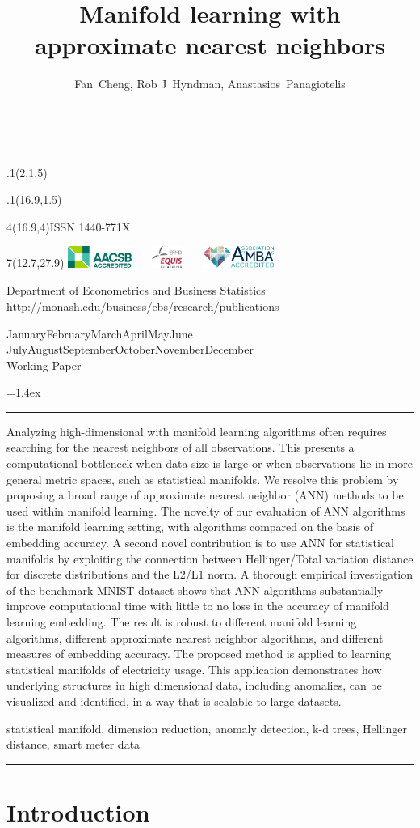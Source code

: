 \documentclass[11pt,a4paper,]{article}
\title{Manifold learning with approximate nearest neighbors}
\author{Fan~Cheng, Rob J~Hyndman, Anastasios~Panagiotelis}
\date{\sf\Date~\Month~\Year}
\makeatletter
\def\Date{\number\day}
\def\Month{\ifcase\month\or
 January\or February\or March\or April\or May\or June\or
 July\or August\or September\or October\or November\or December\fi}
\def\Year{\number\year}
\def\showjel{{\large\textsf{\textbf{JEL classification:}}~\@jel}}
\def\cover{{\sffamily\setcounter{page}{0}
        \thispagestyle{empty}
        \placefig{2}{1.5}{width=5cm}{monash2}
        \placefig{16.9}{1.5}{width=2.1cm}{MBusSchool}
        \begin{textblock}{4}(16.9,4)ISSN 1440-771X\end{textblock}
        \begin{textblock}{7}(12.7,27.9)\hfill
        \includegraphics[height=0.7cm]{AACSB}~~~
        \includegraphics[height=0.7cm]{EQUIS}~~~
        \includegraphics[height=0.7cm]{AMBA}
        \end{textblock}
        \vspace*{2cm}
        \begin{center}\Large
        Department of Econometrics and Business Statistics\\[.5cm]
        \footnotesize http://monash.edu/business/ebs/research/publications
        \end{center}\vspace{2cm}
        \begin{center}
        \fbox{\parbox{14cm}{\begin{onehalfspace}\centering\Huge\vspace*{0.3cm}
                \textsf{\textbf{\expandafter{\@title}}}\vspace{1cm}\par
                \LARGE\@author\end{onehalfspace}
        }}
        \end{center}
        \vfill
                \begin{center}\Large
                \Month~\Year\\[1cm]
                Working Paper \@wp
        \end{center}\vspace*{2cm}}}
\def\pageone{{\sffamily\setstretch{1}%
        \thispagestyle{empty}%
        \vbox to \textheight{%
        \raggedright\baselineskip=1.2cm
     {\fontsize{24.88}{30}\sffamily\textbf{\expandafter{\@title}}}
        \vspace{2cm}\par
        \hspace{1cm}\parbox{14cm}{\sffamily\large\@addresses}\vspace{1cm}\vfill
        \hspace{1cm}{\large\Date~\Month~\Year}\\[1cm]
        \hspace{1cm}\showjel\vss}}}
\def\blindtitle{{\sffamily
     \thispagestyle{plain}\raggedright\baselineskip=1.2cm
     {\fontsize{24.88}{30}\sffamily\textbf{\expandafter{\@title}}}\vspace{1cm}\par
        }}
\def\titlepage{{\cover\newpage\pageone\newpage\blindtitle}}
\let\maketitle\titlepage
\newenvironment{keywords}{\par\vspace{0.5cm}\noindent{\sffamily\textbf{Keywords:}}}{\vspace{0.25cm}\par\hrule\vspace{0.5cm}\par}
\renewenvironment{abstract}{\begin{minipage}{\textwidth}\parskip=1.4ex\noindent
\hrule\vspace{0.1cm}\par{\sffamily\textbf{\abstractname}}\newline}
  {\end{minipage}}
\def\placefig#1#2#3#4{\begin{textblock}{.1}(#1,#2)\rlap{\texttt{[image: \#4]}}\end{textblock}}
\makeatother
\begin{document}
\maketitle
\begin{abstract}
Analyzing high-dimensional with manifold learning algorithms often requires searching for the nearest neighbors of all observations. This presents a computational bottleneck when data size is large or when observations lie in more general metric spaces, such as statistical manifolds. We resolve this problem by proposing a broad range of approximate nearest neighbor (ANN) methods to be used within manifold learning. The novelty of our evaluation of ANN algorithms is the manifold learning setting, with algorithms compared on the basis of embedding accuracy. A second novel contribution is to use ANN for statistical manifolds by exploiting the connection between Hellinger/Total variation distance for discrete distributions and the L2/L1 norm. A thorough empirical investigation of the benchmark MNIST dataset shows that ANN algorithms substantially improve computational time with little to no loss in the accuracy of manifold learning embedding. The result is robust to different manifold learning algorithms, different approximate nearest neighbor algorithms, and different measures of embedding accuracy. The proposed method is applied to learning statistical manifolds of electricity usage. This application demonstrates how underlying structures in high dimensional data, including anomalies, can be visualized and identified, in a way that is scalable to large datasets.
\end{abstract}
\begin{keywords}
statistical manifold, dimension reduction, anomaly detection, k-d trees, Hellinger distance, smart meter data
\end{keywords}

\newpage

\hypertarget{introduction}{%
\section{Introduction}\label{introduction}}
\end{document}

